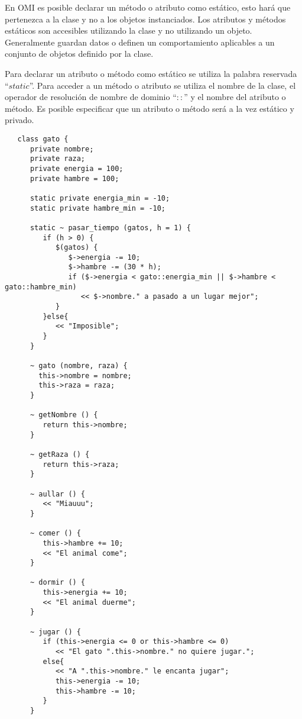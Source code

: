 En OMI es posible declarar un método o atributo como estático, esto hará que pertenezca a la clase y no a los objetos instanciados. 
Los atributos y métodos estáticos son accesibles utilizando la clase y no utilizando un objeto. Generalmente guardan datos o definen un 
comportamiento aplicables a un conjunto de objetos definido por la clase. 

Para declarar un atributo o método como estático se utiliza la palabra reservada ``$static$''. Para acceder a un método o atributo se utiliza el
nombre de la clase, el operador de resolución de nombre de dominio ``$::$'' y el nombre del atributo o método. Es posible especificar que 
un atributo o método será a la vez estático y privado. \\

\begin{lstlisting}
   class gato {
      private nombre; 
      private raza;
      private energia = 100;
      private hambre = 100;
      
      static private energia_min = -10;
      static private hambre_min = -10;
      
      static ~ pasar_tiempo (gatos, h = 1) {
         if (h > 0) {
            $(gatos) {
               $->energia -= 10;
               $->hambre -= (30 * h);
               if ($->energia < gato::energia_min || $->hambre < gato::hambre_min)
                  << $->nombre." a pasado a un lugar mejor";
            }
         }else{
            << "Imposible";
         }
      }
      
      ~ gato (nombre, raza) { 
        this->nombre = nombre; 
        this->raza = raza;
      }
      
      ~ getNombre () {
         return this->nombre;
      }
      
      ~ getRaza () {
         return this->raza;
      }
      
      ~ aullar () { 
         << "Miauuu";
      }
      
      ~ comer () {
         this->hambre += 10;
         << "El animal come";
      }
      
      ~ dormir () {
         this->energia += 10;
         << "El animal duerme";
      }
      
      ~ jugar () {
         if (this->energia <= 0 or this->hambre <= 0)
            << "El gato ".this->nombre." no quiere jugar.";
         else{
            << "A ".this->nombre." le encanta jugar";
            this->energia -= 10;
            this->hambre -= 10;
         }
      }
      

\end{lstlisting}
